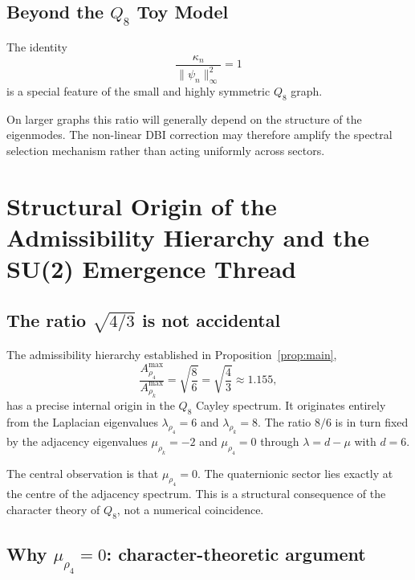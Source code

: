 \documentclass[11pt,a4paper]{article}
\begin{document}
  \subsection{Beyond the $Q_8$ Toy Model}

    The identity
    \[
      \frac{\kappa_n}{\|\psi_n\|_\infty^2}=1
    \]
    is a special feature of the small and highly symmetric $Q_8$ graph.

    On larger graphs this ratio will generally depend on the structure of
    the eigenmodes.
    The non-linear DBI correction may therefore amplify the spectral
    selection mechanism rather than acting uniformly across sectors.
\section{Structural Origin of the Admissibility Hierarchy and the SU(2) Emergence Thread}
  \label{sec:structural-origin-of-hierarchy}

  \subsection{The ratio $\sqrt{4/3}$ is not accidental}
    \label{sec:step4-origin}

    The admissibility hierarchy established in Proposition~\ref{prop:main},
    \begin{equation}
      \frac{A^{\max}_{\rho_4}}{A^{\max}_{\rho_k}}
      = \sqrt{\frac{8}{6}} = \sqrt{\frac{4}{3}} \approx 1.155,
      \label{eq:ratio}
    \end{equation}
    has a precise internal origin in the $Q_8$ Cayley spectrum.
    It originates entirely from the Laplacian eigenvalues
    $\lambda_{\rho_4} = 6$ and $\lambda_{\rho_k} = 8$.
    The ratio $8/6$ is in turn fixed by the adjacency eigenvalues
    $\mu_{\rho_k} = -2$ and $\mu_{\rho_4} = 0$ through $\lambda = d - \mu$ with $d = 6$.

    The central observation is that $\mu_{\rho_4} = 0$.
    The quaternionic sector lies exactly at the centre of the adjacency spectrum.
    This is a structural consequence of the character theory of $Q_8$,
    not a numerical coincidence.

  \subsection{Why $\mu_{\rho_4} = 0$: character-theoretic argument}
    \label{sec:step4-character}
\end{document}
